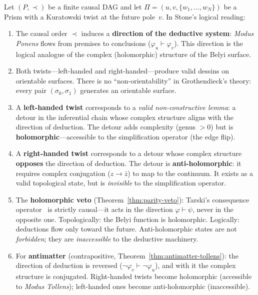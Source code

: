\begin{theorem}
\label{thm:parity-stone}
Let $(P, \prec)$ be a finite causal DAG and let $\Pi = (u, v,
\{w_1, \ldots, w_N\})$ be a Prism with a Kuratowski twist at the future
pole~$v$. In Stone's logical reading:
\begin{enumerate}
  \item The causal order $\prec$ induces a \textbf{direction
    of the deductive system}: \emph{Modus Ponens} flows from premises
    to conclusions ($\varphi_u \vdash \varphi_v$). This direction
    is the logical analogue of the complex (holomorphic) structure
    of the Belyi surface.
  \item Both twists---left-handed and right-handed---produce valid dessins
    on orientable surfaces. There is no ``non-orientability''
    in Grothendieck's theory: every pair $(\sigma_0, \sigma_1)$
    generates an orientable surface.
  \item A \textbf{left-handed twist} corresponds to a
    \emph{valid non-constructive lemma}: a detour in the inferential
    chain whose complex structure aligns with the direction
    of deduction. The detour adds complexity (genus $> 0$)
    but is \textbf{holomorphic}---accessible to the
    simplification operator (the edge flip).
  \item A \textbf{right-handed twist} corresponds to a detour whose
    complex structure \textbf{opposes} the direction of
    deduction. The detour is \textbf{anti-holomorphic}: it requires
    complex conjugation ($z \to \bar{z}$) to map to the
    continuum. It exists as a valid topological state, but
    is \emph{invisible} to the simplification operator.
  \item The \textbf{holomorphic veto}
    (Theorem~\ref{thm:parity-veto}): Tarski's consequence
    operator~\cite{tarski1930} is strictly causal---it acts
    in the direction $\varphi \vdash \psi$, never in the opposite one.
    Topologically: the Belyi function is holomorphic.
    Logically: deductions flow only toward the future.
    Anti-holomorphic states are not \emph{forbidden}; they are
    \emph{inaccessible} to the deductive machinery.
  \item For \textbf{antimatter} (contrapositive,
    Theorem~\ref{thm:antimatter-tollens}): the direction of
    deduction is reversed ($\neg\varphi_v \vdash \neg\varphi_u$),
    and with it the complex structure is conjugated. Right-handed
    twists become holomorphic (accessible to \emph{Modus
    Tollens}); left-handed ones become anti-holomorphic (inaccessible).
\end{enumerate}
\end{theorem}

